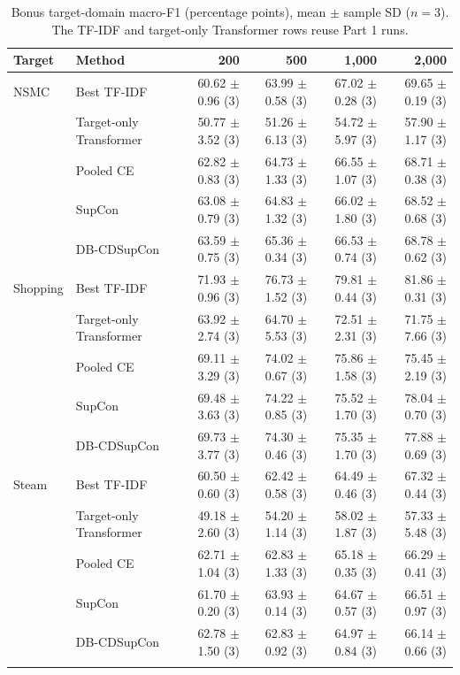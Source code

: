 \begin{table}[t]
\centering
\caption{Bonus target-domain macro-F1 (percentage points), mean $\pm$ sample SD ($n=3$). The TF-IDF and target-only Transformer rows reuse Part 1 runs.}
\label{tab:bonus-performance}
\scriptsize
\setlength{\tabcolsep}{3.5pt}
\begin{tabular}{llrrrr}
\toprule
Target & Method & 200 & 500 & 1,000 & 2,000 \\
\midrule
NSMC & Best TF-IDF & 60.62 $\pm$ 0.96 (3) & 63.99 $\pm$ 0.58 (3) & 67.02 $\pm$ 0.28 (3) & 69.65 $\pm$ 0.19 (3) \\
 & Target-only Transformer & 50.77 $\pm$ 3.52 (3) & 51.26 $\pm$ 6.13 (3) & 54.72 $\pm$ 5.97 (3) & 57.90 $\pm$ 1.17 (3) \\
 & Pooled CE & 62.82 $\pm$ 0.83 (3) & 64.73 $\pm$ 1.33 (3) & 66.55 $\pm$ 1.07 (3) & 68.71 $\pm$ 0.38 (3) \\
 & SupCon & 63.08 $\pm$ 0.79 (3) & 64.83 $\pm$ 1.32 (3) & 66.02 $\pm$ 1.80 (3) & 68.52 $\pm$ 0.68 (3) \\
 & DB-CDSupCon & 63.59 $\pm$ 0.75 (3) & 65.36 $\pm$ 0.34 (3) & 66.53 $\pm$ 0.74 (3) & 68.78 $\pm$ 0.62 (3) \\
\addlinespace
Shopping & Best TF-IDF & 71.93 $\pm$ 0.96 (3) & 76.73 $\pm$ 1.52 (3) & 79.81 $\pm$ 0.44 (3) & 81.86 $\pm$ 0.31 (3) \\
 & Target-only Transformer & 63.92 $\pm$ 2.74 (3) & 64.70 $\pm$ 5.53 (3) & 72.51 $\pm$ 2.31 (3) & 71.75 $\pm$ 7.66 (3) \\
 & Pooled CE & 69.11 $\pm$ 3.29 (3) & 74.02 $\pm$ 0.67 (3) & 75.86 $\pm$ 1.58 (3) & 75.45 $\pm$ 2.19 (3) \\
 & SupCon & 69.48 $\pm$ 3.63 (3) & 74.22 $\pm$ 0.85 (3) & 75.52 $\pm$ 1.70 (3) & 78.04 $\pm$ 0.70 (3) \\
 & DB-CDSupCon & 69.73 $\pm$ 3.77 (3) & 74.30 $\pm$ 0.46 (3) & 75.35 $\pm$ 1.70 (3) & 77.88 $\pm$ 0.69 (3) \\
\addlinespace
Steam & Best TF-IDF & 60.50 $\pm$ 0.60 (3) & 62.42 $\pm$ 0.58 (3) & 64.49 $\pm$ 0.46 (3) & 67.32 $\pm$ 0.44 (3) \\
 & Target-only Transformer & 49.18 $\pm$ 2.60 (3) & 54.20 $\pm$ 1.14 (3) & 58.02 $\pm$ 1.87 (3) & 57.33 $\pm$ 5.48 (3) \\
 & Pooled CE & 62.71 $\pm$ 1.04 (3) & 62.83 $\pm$ 1.33 (3) & 65.18 $\pm$ 0.35 (3) & 66.29 $\pm$ 0.41 (3) \\
 & SupCon & 61.70 $\pm$ 0.20 (3) & 63.93 $\pm$ 0.14 (3) & 64.67 $\pm$ 0.57 (3) & 66.51 $\pm$ 0.97 (3) \\
 & DB-CDSupCon & 62.78 $\pm$ 1.50 (3) & 62.83 $\pm$ 0.92 (3) & 64.97 $\pm$ 0.84 (3) & 66.14 $\pm$ 0.66 (3) \\
\addlinespace
\bottomrule
\end{tabular}
\end{table}
